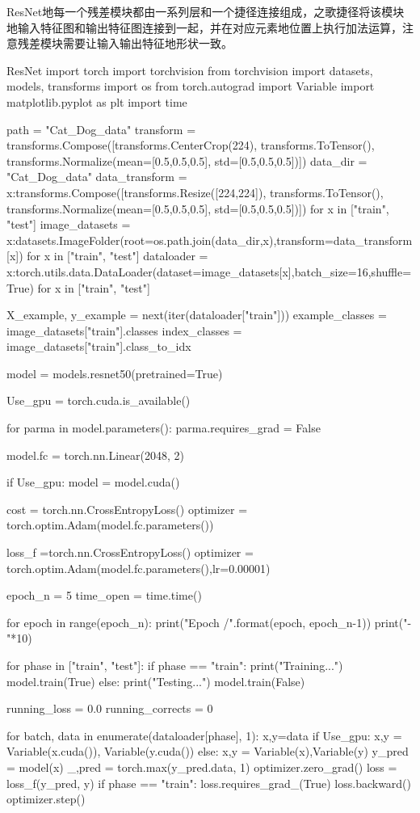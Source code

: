 \documentclass[openbib]{article}
\begin{document}
ResNet地每一个残差模块都由一系列层和一个捷径连接组成，之歌捷径将该模块地输入特征图和输出特征图连接到一起，并在对应元素地位置上执行加法运算，注意残差模块需要让输入输出特征地形状一致。
\begin{Python}{ResNet}
	import torch
	import torchvision
	from torchvision import datasets, models, transforms
	import os
	from torch.autograd import Variable
	import matplotlib.pyplot as plt
	import time
	
	path = "Cat_Dog_data"
	transform = transforms.Compose([transforms.CenterCrop(224),
	transforms.ToTensor(),
	transforms.Normalize(mean=[0.5,0.5,0.5], std=[0.5,0.5,0.5])])
	data_dir = "Cat_Dog_data"
	data_transform = {x:transforms.Compose([transforms.Resize([224,224]),
		transforms.ToTensor(),
		transforms.Normalize(mean=[0.5,0.5,0.5], std=[0.5,0.5,0.5])])
		for x in ["train", "test"]}
	image_datasets = {x:datasets.ImageFolder(root=os.path.join(data_dir,x),transform=data_transform[x])
		for x in ["train", "test"]}
	dataloader = {x:torch.utils.data.DataLoader(dataset=image_datasets[x],batch_size=16,shuffle=True)
		for x in ["train", "test"]}
	
	X_example, y_example = next(iter(dataloader["train"]))
	example_classes = image_datasets["train"].classes
	index_classes = image_datasets["train"].class_to_idx
	
	model = models.resnet50(pretrained=True)
	
	Use_gpu = torch.cuda.is_available()
	
	for parma in model.parameters():
	parma.requires_grad = False
	
	model.fc = torch.nn.Linear(2048, 2)
	
	if Use_gpu:
	model = model.cuda()
	
	cost = torch.nn.CrossEntropyLoss()
	optimizer = torch.optim.Adam(model.fc.parameters())
	
	loss_f =torch.nn.CrossEntropyLoss()
	optimizer = torch.optim.Adam(model.fc.parameters(),lr=0.00001)
	
	epoch_n = 5
	time_open = time.time()
	
	for epoch in range(epoch_n):
	print("Epoch {}/{}".format(epoch, epoch_n-1))
	print("-"*10)
	
	for phase in ["train", "test"]:
	if phase == "train":
	print("Training...")
	model.train(True)
	else:
	print("Testing...")
	model.train(False)
	
	running_loss = 0.0
	running_corrects = 0
	
	for batch, data in enumerate(dataloader[phase], 1):
	x,y=data
	if Use_gpu:
	x,y = Variable(x.cuda()), Variable(y.cuda())
	else:
	x,y = Variable(x),Variable(y)
	y_pred = model(x)
	_,pred = torch.max(y_pred.data, 1)
	optimizer.zero_grad()
	loss = loss_f(y_pred, y)
	if phase == "train":
	loss.requires_grad_(True)
	loss.backward()
	optimizer.step()
	

\end{Python}
\end{document}
